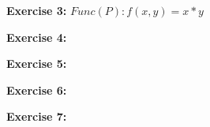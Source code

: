 \documentclass [11pt]{article}
\begin{document}
\bigskip
\noindent
\textbf{Exercise 3:}
$Func(P): f(x,y) = x*y$

\bigskip
\noindent
\textbf{Exercise 4:}

\bigskip
\noindent
\textbf{Exercise 5:}

\bigskip
\noindent
\textbf{Exercise 6:}

\bigskip
\noindent
\textbf{Exercise 7:}
\end{document}
